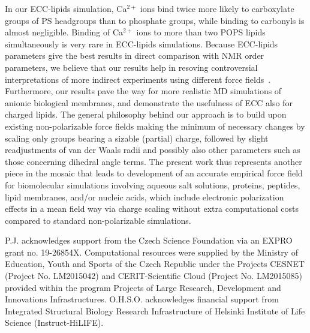 \documentclass[journal=jpcbfk,manuscript=article]{achemso}
\begin{document}
In our ECC-lipids simulation, Ca$^{2+}$ ions bind twice more likely to carboxylate groups
of PS headgroups than to phosphate groups, while binding to carbonyls is almost negligible.
Binding of Ca$^{2+}$ ions to more than two POPS lipids simultaneously is very rare in ECC-lipids simulations.
Because ECC-lipids parameters give the best results in direct comparison with NMR order parameters, 
we believe that our results help in resoving controversial interpretations of more indirect experiments
using different force fields~\cite{melcrova16,valentine18,hallock18}.
Furthermore, our results pave the way for more realistic MD simulations of anionic biological membranes,
and demonstrate the usefulness of ECC also for charged lipids. The general philosophy behind our approach is to build upon existing non-polarizable force fields making the minimum of necessary changes by scaling only groups bearing a sizable (partial) charge, followed by slight readjustments of van der Waals radii and possibly also other parameters such as those concerning dihedral angle terms. The present work thus represents another piece in the mosaic that leads to development of an accurate empirical force field for biomolecular simulations involving aqueous salt solutions, proteins, peptides, lipid membranes, and/or nucleic acids, which include electronic polarization effects in a mean field way via charge scaling without extra computational costs compared to standard non-polarizable simulations. 





\listoftodos


\begin{acknowledgement} 
P.J. acknowledges support from the Czech Science Foundation via an EXPRO grant no. 19-26854X. 
Computational resources were supplied by the Ministry of Education, Youth and Sports 
of the Czech Republic under the Projects CESNET (Project No. LM2015042) and CERIT-Scientific 
Cloud (Project No. LM2015085) provided within the program Projects of Large Research, 
Development and Innovations Infrastructures. 
O.H.S.O. acknowledges financial support from 
Integrated Structural Biology Research Infrastructure of 
Helsinki Institute of Life Science (Instruct-HiLIFE). 
\end{acknowledgement} 
 
\end{document}
